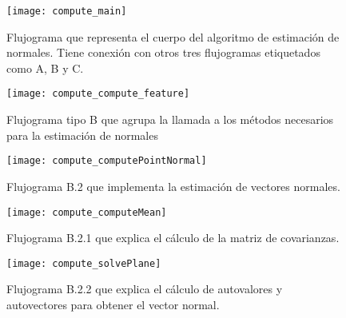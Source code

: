 \begin{figure}[h!]
\centering
\texttt{[image: compute\_main]}
\caption{Flujograma que representa el cuerpo del algoritmo de estimación de normales. Tiene conexión con otros tres flujogramas etiquetados como A, B y C.}\label{fig:compute_main}
\end{figure}

\begin{figure}[h!]
\centering
\texttt{[image: compute\_compute\_feature]}
\caption{Flujograma tipo B que agrupa la llamada a los métodos necesarios para la estimación de normales}\label{fig:compute_compute_feature}
\end{figure}

\begin{figure}[h!]
\centering
\texttt{[image: compute\_computePointNormal]}
\caption{Flujograma B.2 que implementa la estimación de vectores normales.}\label{fig:compute_computePointNormal}
\end{figure}


\begin{figure}[h!]
\centering
\texttt{[image: compute\_computeMean]}
\caption{Flujograma B.2.1 que explica el cálculo de la matriz de covarianzas.}\label{fig:compute_computeMean}
\end{figure}


\begin{figure}[h!]
\centering
\texttt{[image: compute\_solvePlane]}
\caption{Flujograma B.2.2 que explica el cálculo de autovalores y autovectores para obtener el vector normal.}\label{fig:compute_solvePlane}
\end{figure}
